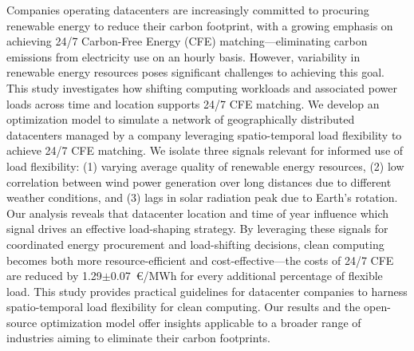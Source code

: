 %


Companies operating datacenters are increasingly committed to procuring renewable energy to reduce their carbon footprint, with a growing emphasis on achieving 24/7 Carbon-Free Energy (CFE) matching---eliminating carbon emissions from electricity use on an hourly basis.
However, variability in renewable energy resources poses significant challenges to achieving this goal.
This study investigates how shifting computing workloads and associated power loads across time and location supports 24/7 CFE matching.
We develop an optimization model to simulate a network of geographically distributed datacenters managed by a company leveraging spatio-temporal load flexibility to achieve 24/7 CFE matching.
We isolate three signals relevant for informed use of load flexibility: (1) varying average quality of renewable energy resources, (2) low correlation between wind power generation over long distances due to different weather conditions, and (3) lags in solar radiation peak due to Earth's rotation.
Our analysis reveals that datacenter location and time of year influence which signal drives an effective load-shaping strategy.
By leveraging these signals for coordinated energy procurement and load-shifting decisions, clean computing becomes both more resource-efficient and cost-effective---the costs of 24/7 CFE are reduced by 1.29$\pm$0.07~\euro/MWh for every additional percentage of flexible load.
This study provides practical guidelines for datacenter companies to harness spatio-temporal load flexibility for clean computing.
Our results and the open-source optimization model offer insights applicable to a broader range of industries aiming to eliminate their carbon footprints.